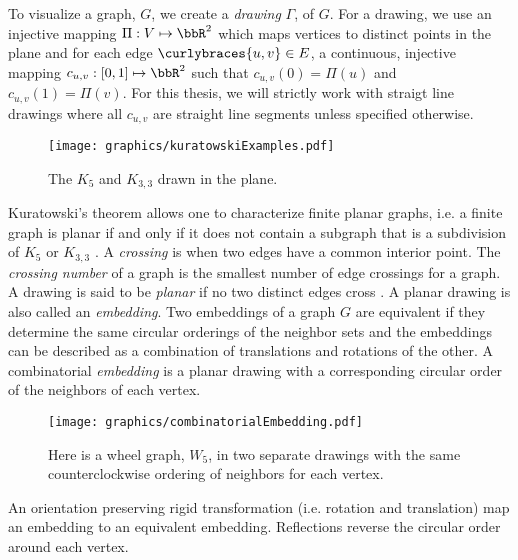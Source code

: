 To visualize a graph, $G$, we create a \textit{drawing} $\Gamma$, of $G$.  
For a drawing, we use an injective mapping $\Pi : V \mapsto \bbR^{2}$ which maps vertices to distinct points in the plane and for each edge $\curlybraces{u,v} \in E$, a continuous, injective mapping $c_{u,v}:[0,1]\mapsto \bbR^2$ such that $c_{u,v}(0) = \Pi(u)$ and $c_{u,v}(1) = \Pi(v)$. 
For this thesis, we will strictly work with straigt line drawings where all $c_{u,v}$ are straight line segments unless specified otherwise.
\begin{figure}[!htbp]
\begin{center}
\texttt{[image: graphics/kuratowskiExamples.pdf]}
\caption{The $K_5$ and $K_{3,3}$ drawn in the plane.}\label{fig:kuratowskiExamples.pdf}
\end{center} 
\end{figure} 
Kuratowski's theorem allows one to characterize finite planar graphs, i.e. a finite graph is planar if and only if it does not contain a subgraph that is a subdivision of $K_5$ or $K_{3,3}$ \cite{kuratowski1930probleme}. 
A \textit{crossing} is when two edges have a common interior point.  
The \textit{crossing number} of a graph is the smallest number of edge crossings for a graph.
A drawing is said to be \textit{planar} if no two distinct edges cross \cite{BET+99}.
A planar drawing is also called an \textit{embedding}.
Two embeddings of a graph $G$ are equivalent if they determine the same circular orderings of the neighbor sets and the embeddings can be described as a combination of translations and rotations of the other.
A combinatorial \textit{embedding} is a planar drawing with a corresponding circular order of the neighbors of each vertex. 
\begin{figure}[!htbp]
\begin{center}
    \texttt{[image: graphics/combinatorialEmbedding.pdf]}
    \caption{Here is a wheel graph, $W_5$, in two separate drawings with the same counterclockwise ordering of neighbors for each vertex.}\label{fig:combinatorialEmbedding.pdf}
\end{center}
\end{figure}
An orientation preserving rigid transformation (i.e. rotation and translation) map an embedding to an equivalent embedding.  Reflections reverse the circular order around each vertex.

